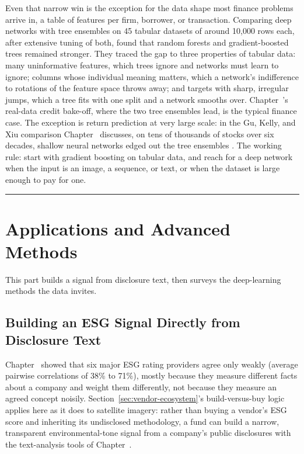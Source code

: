 \documentclass[../ai_in_finance]{subfiles}
\begin{document}
Even that narrow win is the exception for the data shape most finance problems arrive in, a table of features per firm, borrower, or transaction. Comparing deep networks with tree ensembles on 45 tabular datasets of around 10,000 rows each, after extensive tuning of both, \textcite{grinsztajn2022tree} found that random forests and gradient-boosted trees remained stronger. They traced the gap to three properties of tabular data: many uninformative features, which trees ignore and networks must learn to ignore; columns whose individual meaning matters, which a network's indifference to rotations of the feature space throws away; and targets with sharp, irregular jumps, which a tree fits with one split and a network smooths over. Chapter~'s real-data credit bake-off, where the two tree ensembles lead, is the typical finance case. The exception is return prediction at very large scale: in the Gu, Kelly, and Xiu comparison Chapter~ discusses, on tens of thousands of stocks over six decades, shallow neural networks edged out the tree ensembles \parencite{gu2020empirical}. The working rule: start with gradient boosting on tabular data, and reach for a deep network when the input is an image, a sequence, or text, or when the dataset is large enough to pay for one.
\par\nopagebreak\noindent\rule{\linewidth}{0.6pt}
\medskip

\section{Applications and Advanced Methods}

This part builds a signal from disclosure text, then surveys the deep-learning methods the data invites.

\subsection{Building an ESG Signal Directly from Disclosure Text}
\label{sec:esg-text-signal}

Chapter~ showed that six major ESG rating providers agree only weakly (average pairwise correlations of 38\% to 71\%), mostly because they measure different facts about a company and weight them differently, not because they measure an agreed concept noisily. Section~\ref{sec:vendor-ecosystem}'s build-versus-buy logic applies here as it does to satellite imagery: rather than buying a vendor's ESG score and inheriting its undisclosed methodology, a fund can build a narrow, transparent environmental-tone signal from a company's public disclosures with the text-analysis tools of Chapter~.
\end{document}
